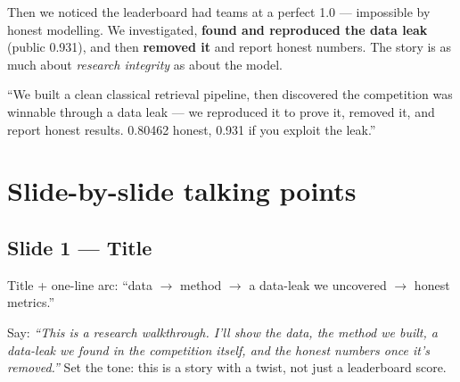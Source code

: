\documentclass[12pt,a4paper]{article}
\begin{document}
Then we noticed the leaderboard had teams at a perfect 1.0 — impossible by honest
modelling. We investigated, \textbf{found and reproduced the data leak} (public 0.931),
and then \textbf{removed it} and report honest numbers. The story is as much about
\emph{research integrity} as about the model.

\begin{compression}
``We built a clean classical retrieval pipeline, then discovered the competition was
winnable through a data leak — we reproduced it to prove it, removed it, and report
honest results. 0.80462 honest, 0.931 if you exploit the leak.''
\end{compression}

\section{Slide-by-slide talking points}

\subsection{Slide 1 — Title}
\begin{system}
Title + one-line arc: ``data $\rightarrow$ method $\rightarrow$ a data-leak we uncovered
$\rightarrow$ honest metrics.''
\end{system}
Say: \emph{``This is a research walkthrough. I'll show the data, the method we built,
a data-leak we found in the competition itself, and the honest numbers once it's
removed.''} Set the tone: this is a story with a twist, not just a leaderboard score.
\end{document}
